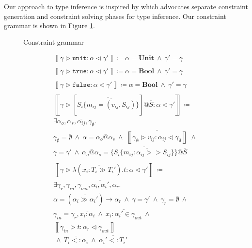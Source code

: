 \documentclass[preprint]{sigplanconf}
\newcommand{\figref}[1]{Figure \ref{#1}}
\newcommand{\inferrule}[4]{\left\llbracket #1 \triangleright #2 : #3 \triangleleft #4 \right\rrbracket}
\newcommand{\inferlhs}[1]{\left\llbracket \gamma \triangleright #1 : \alpha \triangleleft \gamma' \right\rrbracket}
\newcommand{\unitv}{\mathtt{unit}}
\newcommand{\unitt}{\mathbf{Unit}}
\newcommand{\truev}{\mathtt{true}}
\newcommand{\falsev}{\mathtt{false}}
\newcommand{\boolt}{\mathbf{Bool}}
\newcommand{\cand}{\:\wedge\:}
\begin{document}
Our approach to type inference is inspired by \cite{Pottier2005} which advocates
separate constraint generation and constraint solving phases for
type inference. Our constraint grammar is shown in \figref{fig:congrammar}.

\begin{figure}
\ottgrammartabular{
\ottC\ottinterrule
\ottctxc\ottinterrule
\otttyc\ottinterrule
\otttinf\ottinterrule
\ottoinf\ottinterrule
\ottsinf\ottinterrule
}
\caption{\label{fig:congrammar} Constraint grammar}
\end{figure}

\begin{figure}
\[
\begin{array}{ll}

\inferlhs{\unitv} \coloneqq \alpha = \unitt \cand \gamma' = \gamma
\\\\

\inferlhs{\truev} \coloneqq \alpha = \boolt \cand \gamma' = \gamma 
\\\\

\inferlhs{\falsev} \coloneqq \alpha = \boolt \cand \gamma' = \gamma 
\\\\

\inferlhs{[ \overline{S_i \{ \overline{ m_{ij} = (v_{ij}, S_{ij}) } \} }]@\overline{S}}
\coloneqq \\
\exists \alpha_o, \alpha_s, \overline{\alpha_{ij}}, \gamma_{\emptyset} . \\
\gamma_{\emptyset} = \emptyset
\cand
\alpha = \alpha_o@\alpha_s
\cand
\overline{\inferrule{\gamma_{\emptyset}}{v_{ij}}{\alpha_{ij}}{\gamma_{\emptyset}}}
\cand
\\
\gamma = \gamma'
\cand
\alpha_o @ \alpha_s = \{ \overline{ S_i \{ \overline{ m_{ij} : \alpha_{ij} >> S_{ij} } \} }\} @ \overline{S}
\\\\

\inferlhs{\lambda ( \overline{x_i : T_i \gg T_i'} ) . t} \coloneqq \\
\exists \gamma_r, \gamma_{in}, \gamma_{out}, \overline{\alpha_i, \alpha_i'}, \alpha_r . \\
\alpha = (\overline{\alpha_i \gg \alpha_i'}) \rightarrow \alpha_r
\cand
\gamma = \gamma'
\cand
\gamma_r = \emptyset
\cand \\
\gamma_{in} = \gamma_r, \overline{x_i : \alpha_i}
\cand
\overline{x_i : \alpha_i' \in \gamma_{out}}
\cand
\\
\inferrule{\gamma_{in}}{t}{\alpha_r}{\gamma_{out}}
\\
\cand
\overline{T_i <: \alpha_i}
\cand
\overline{\alpha_i' <: T_i'}
\\\\


\end{array}\]
\end{figure}
\end{document}

